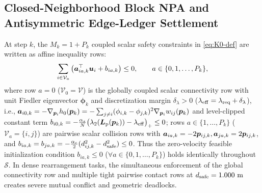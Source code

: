\subsection{Closed-Neighborhood Block NPA and Antisymmetric Edge-Ledger Settlement}\label{subsec:npa-prelim}
At step $k$, the $M_k=1+P_k$ coupled scalar safety constraints in \eqref{eq:K0-def} are written as affine inequality rows:
\begin{equation}
 \sum_{i\in\mathcal V_a}\big(\boldsymbol a_{ia,k}^{\top}\boldsymbol{u}_i+b_{ia,k}\big)\le 0,\qquad a\in\{0,1,\dots,P_k\},
 \label{eq:coupled-rows}
\end{equation}
where row $a=0$ ($\mathcal V_0=\mathcal V$) is the globally coupled scalar connectivity row with unit Fiedler eigenvector $\boldsymbol\phi_k$ and discretization margin $\delta_\lambda>0$ ($\lambda_{\mathrm{eff}}=\lambda_{\mathrm{req}}+\delta_\lambda$), i.e., $\boldsymbol a_{i0,k}=-\nabla_{\boldsymbol{p}_i}h_0(\boldsymbol{p}_k)=-\sum_{j\ne i}(\phi_{i,k}-\phi_{j,k})^2\nabla_{\boldsymbol{p}_i}w_{ij}(\boldsymbol{p}_k)$ and level-clipped constant term $b_{i0,k}=-\frac{\alpha_s}{N}\big(\lambda_2(\boldsymbol{L}_{\mathrm{p}}(\boldsymbol{p}_k))-\lambda_{\mathrm{eff}}\big)_+\le 0$; rows $a\in\{1,\dots,P_k\}$ ($\mathcal V_a=\{i,j\}$) are pairwise scalar collision rows with $\boldsymbol a_{ia,k}=-2\boldsymbol{p}_{ij,k},\boldsymbol a_{ja,k}=2\boldsymbol{p}_{ij,k}$, and $b_{ia,k}=b_{ja,k}=-\frac{\alpha_c}{2}(d_{ij,k}^2-d_{\mathrm{safe}}^2)\le 0$. Thus the zero-velocity feasible initialization condition $b_{ia,k}\le 0$ ($\forall a\in\{0,1,\dots,P_k\}$) holds identically throughout $\mathcal S$. In dense rearrangement tasks, the simultaneous enforcement of the global connectivity row and multiple tight pairwise contact rows at $d_{\mathrm{safe}}=1.000\ \mathrm m$ creates severe mutual conflict and geometric deadlocks.

